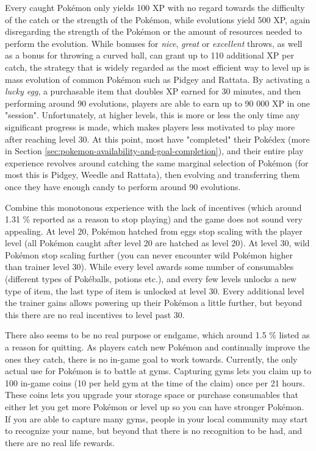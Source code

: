 Every caught Pokémon only yields 100 XP with no regard towards the difficulty of the catch or the strength of the Pokémon, while evolutions yield 500 XP, again disregarding the strength of the Pokémon or the amount of resources needed to perform the evolution. While bonuses for \emph{nice}, \emph{great} or \emph{excellent} throws, as well as a bonus for throwing a curved ball, can grant up to 110 additional XP per catch, the strategy that is widely regarded as the most efficient way to level up is mass evolution of common Pokémon such as Pidgey and Rattata. By activating a \emph{lucky egg}, a purchasable item that doubles XP earned for 30 minutes, and then performing around 90 evolutions, players are able to earn up to 90 000 XP in one "session". Unfortunately, at higher levels, this is more or less the only time any significant progress is made, which makes players less motivated to play more after reaching level 30. At this point, most have "completed" their Pokédex (more in Section \ref{sec:pokemon-availability-and-goal-completion}), and their entire play experience revolves around catching the same marginal selection of Pokémon (for most this is Pidgey, Weedle and Rattata), then evolving and transferring them once they have enough candy to perform around 90 evolutions.

Combine this monotonous experience with the lack of incentives (which around 1.31 \% reported as a reason to stop playing) and the game does not sound very appealing. At level 20, Pokémon hatched from eggs stop scaling with the player level (all Pokémon caught after level 20 are hatched as level 20). At level 30, wild Pokémon stop scaling further (you can never encounter wild Pokémon higher than trainer level 30). While every level awards some number of consumables (different types of Pokéballs, potions etc.), and every few levels unlocks a new type of item, the last type of item is unlocked at level 30. Every additional level the trainer gains allows powering up their Pokémon a little further, but beyond this there are no real incentives to level past 30.

There also seems to be no real purpose or endgame, which around 1.5 \% listed as a reason for quitting. As players catch new Pokémon and continually improve the ones they catch, there is no in-game goal to work towards. Currently, the only actual use for Pokémon is to battle at gyms. Capturing gyms lets you claim up to 100 in-game coins (10 per held gym at the time of the claim) once per 21 hours. These coins lets you upgrade your storage space or purchase consumables that either let you get more Pokémon or level up so you can have stronger Pokémon. If you are able to capture many gyms, people in your local community may start to recognize your name, but beyond that there is no recognition to be had, and there are no real life rewards.

